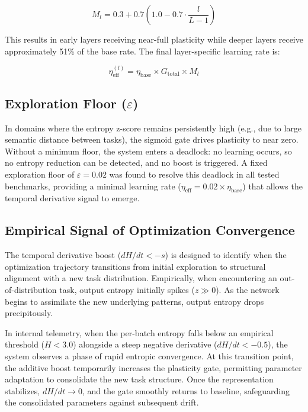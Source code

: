 \documentclass[11pt,a4paper]{article}
\begin{document}
\begin{equation}
M_l = 0.3 + 0.7 \left(1.0 - 0.7 \cdot \frac{l}{L-1}\right)
\end{equation}

This results in early layers receiving near-full plasticity while deeper layers receive approximately 51\% of the base rate. The final layer-specific learning rate is:

\begin{equation}
\eta_{\text{eff}}^{(l)} = \eta_{\text{base}} \times G_{\text{total}} \times M_l
\end{equation}

\subsection{Exploration Floor (\texorpdfstring{$\varepsilon$}{epsilon})}

In domains where the entropy z-score remains persistently high (e.g., due to large semantic distance between tasks), the sigmoid gate drives plasticity to near zero. Without a minimum floor, the system enters a deadlock: no learning occurs, so no entropy reduction can be detected, and no boost is triggered. A fixed exploration floor of $\varepsilon = 0.02$ was found to resolve this deadlock in all tested benchmarks, providing a minimal learning rate ($\eta_{\text{eff}} = 0.02 \times \eta_{\text{base}}$) that allows the temporal derivative signal to emerge.

\subsection{Empirical Signal of Optimization Convergence}

The temporal derivative boost ($dH/dt < -s$) is designed to identify when the optimization trajectory transitions from initial exploration to structural alignment with a new task distribution. Empirically, when encountering an out-of-distribution task, output entropy initially spikes ($z \gg 0$). As the network begins to assimilate the new underlying patterns, output entropy drops precipitously.

In internal telemetry, when the per-batch entropy falls below an empirical threshold ($H < 3.0$) alongside a steep negative derivative ($dH/dt < -0.5$), the system observes a phase of rapid entropic convergence. At this transition point, the additive boost temporarily increases the plasticity gate, permitting parameter adaptation to consolidate the new task structure. Once the representation stabilizes, $dH/dt \to 0$, and the gate smoothly returns to baseline, safeguarding the consolidated parameters against subsequent drift.
\end{document}
